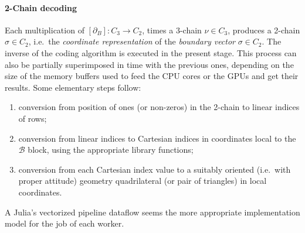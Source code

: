 \paragraph{2-Chain decoding} 
Each multiplication of $[\partial_B] : C_3 \to C_2$, times a 3-chain $\nu\in C_3$, produces a 2-chain  $\sigma\in C_2$, i.e.~the \emph{coordinate representation} of the \emph{boundary vector} $\sigma\in C_2$.  The inverse of the coding algorithm is executed in the present stage.  This process can also be partially superimposed in time with the previous ones, depending on the size of the memory buffers used to feed the CPU cores or the GPUs and get their results. Some elementary steps follow:

\begin{enumerate}

\item conversion from position of ones (or non-zeros) in the 2-chain to linear indices of rows;

\item conversion from linear indices to Cartesian indices in coordinates local to the $\mathcal{B}$ block, using the appropriate library functions;

\item conversion from each Cartesian index value to a suitably oriented (i.e.~with proper attitude) geometry quadrilateral (or pair of triangles) in local coordinates.

\end{enumerate}

A Julia's vectorized pipeline dataflow seems the more appropriate implementation model for the job of each worker.

